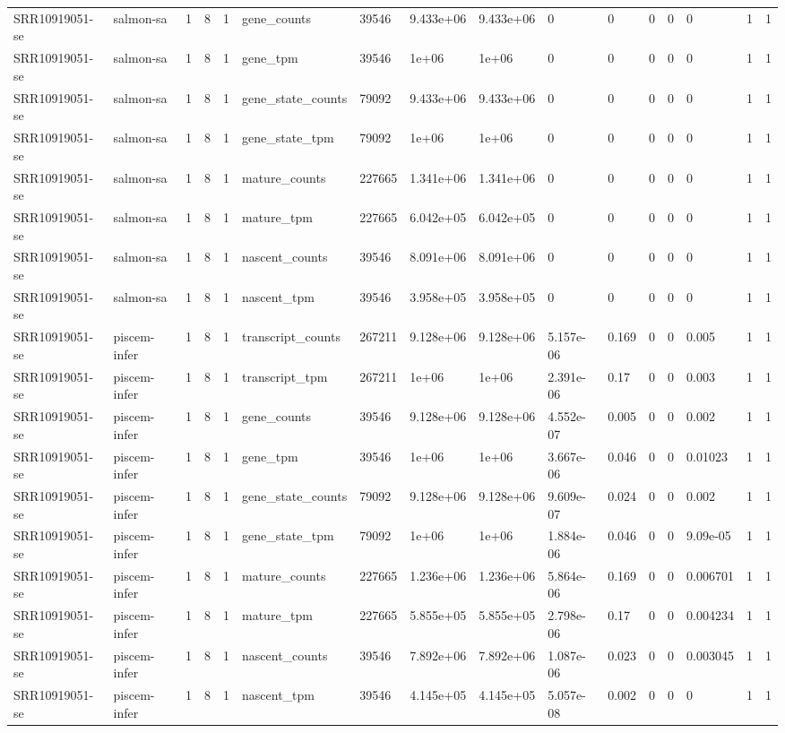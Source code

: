 \begin{tabular}{llllllllllllllll}
SRR10919051-se & salmon-sa & 1 & 8 & 1 & gene\_counts & 39546 & 9.433e+06 & 9.433e+06 & 0 & 0 & 0 & 0 & 0 & 1 & 1 \\
SRR10919051-se & salmon-sa & 1 & 8 & 1 & gene\_tpm & 39546 & 1e+06 & 1e+06 & 0 & 0 & 0 & 0 & 0 & 1 & 1 \\
SRR10919051-se & salmon-sa & 1 & 8 & 1 & gene\_state\_counts & 79092 & 9.433e+06 & 9.433e+06 & 0 & 0 & 0 & 0 & 0 & 1 & 1 \\
SRR10919051-se & salmon-sa & 1 & 8 & 1 & gene\_state\_tpm & 79092 & 1e+06 & 1e+06 & 0 & 0 & 0 & 0 & 0 & 1 & 1 \\
SRR10919051-se & salmon-sa & 1 & 8 & 1 & mature\_counts & 227665 & 1.341e+06 & 1.341e+06 & 0 & 0 & 0 & 0 & 0 & 1 & 1 \\
SRR10919051-se & salmon-sa & 1 & 8 & 1 & mature\_tpm & 227665 & 6.042e+05 & 6.042e+05 & 0 & 0 & 0 & 0 & 0 & 1 & 1 \\
SRR10919051-se & salmon-sa & 1 & 8 & 1 & nascent\_counts & 39546 & 8.091e+06 & 8.091e+06 & 0 & 0 & 0 & 0 & 0 & 1 & 1 \\
SRR10919051-se & salmon-sa & 1 & 8 & 1 & nascent\_tpm & 39546 & 3.958e+05 & 3.958e+05 & 0 & 0 & 0 & 0 & 0 & 1 & 1 \\
SRR10919051-se & piscem-infer & 1 & 8 & 1 & transcript\_counts & 267211 & 9.128e+06 & 9.128e+06 & 5.157e-06 & 0.169 & 0 & 0 & 0.005 & 1 & 1 \\
SRR10919051-se & piscem-infer & 1 & 8 & 1 & transcript\_tpm & 267211 & 1e+06 & 1e+06 & 2.391e-06 & 0.17 & 0 & 0 & 0.003 & 1 & 1 \\
SRR10919051-se & piscem-infer & 1 & 8 & 1 & gene\_counts & 39546 & 9.128e+06 & 9.128e+06 & 4.552e-07 & 0.005 & 0 & 0 & 0.002 & 1 & 1 \\
SRR10919051-se & piscem-infer & 1 & 8 & 1 & gene\_tpm & 39546 & 1e+06 & 1e+06 & 3.667e-06 & 0.046 & 0 & 0 & 0.01023 & 1 & 1 \\
SRR10919051-se & piscem-infer & 1 & 8 & 1 & gene\_state\_counts & 79092 & 9.128e+06 & 9.128e+06 & 9.609e-07 & 0.024 & 0 & 0 & 0.002 & 1 & 1 \\
SRR10919051-se & piscem-infer & 1 & 8 & 1 & gene\_state\_tpm & 79092 & 1e+06 & 1e+06 & 1.884e-06 & 0.046 & 0 & 0 & 9.09e-05 & 1 & 1 \\
SRR10919051-se & piscem-infer & 1 & 8 & 1 & mature\_counts & 227665 & 1.236e+06 & 1.236e+06 & 5.864e-06 & 0.169 & 0 & 0 & 0.006701 & 1 & 1 \\
SRR10919051-se & piscem-infer & 1 & 8 & 1 & mature\_tpm & 227665 & 5.855e+05 & 5.855e+05 & 2.798e-06 & 0.17 & 0 & 0 & 0.004234 & 1 & 1 \\
SRR10919051-se & piscem-infer & 1 & 8 & 1 & nascent\_counts & 39546 & 7.892e+06 & 7.892e+06 & 1.087e-06 & 0.023 & 0 & 0 & 0.003045 & 1 & 1 \\
SRR10919051-se & piscem-infer & 1 & 8 & 1 & nascent\_tpm & 39546 & 4.145e+05 & 4.145e+05 & 5.057e-08 & 0.002 & 0 & 0 & 0 & 1 & 1 \\
\bottomrule
\end{tabular}
